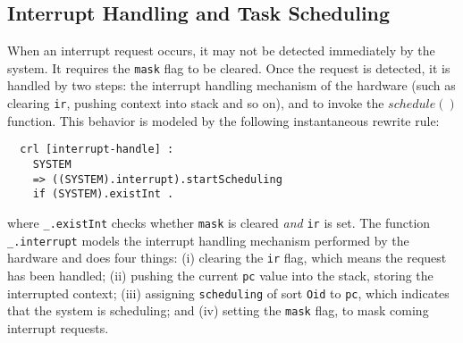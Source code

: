 \documentclass[10pt,journal,compsoc]{IEEEtran}
\begin{document}
\subsection{Interrupt Handling and Task Scheduling}
\label{ss:inthandling}
When an interrupt request occurs, it may not be detected immediately
by the system. It requires the \verb|mask| flag to be cleared. Once
the request is detected, it is handled by two steps: the interrupt
handling mechanism of the hardware (such as clearing \verb|ir|,
pushing context into stack and so on), and to invoke the $schedule()$
function. This behavior is modeled by the following instantaneous
rewrite rule:
\begin{verbatim}
  crl [interrupt-handle] :
    SYSTEM 
    => ((SYSTEM).interrupt).startScheduling
    if (SYSTEM).existInt .
\end{verbatim}
where \verb|_.existInt| checks whether \verb|mask| is cleared
\emph{and} \verb|ir| is set. The function \verb|_.interrupt| models
the interrupt handling mechanism performed by the hardware and does
four things: (i) clearing the \verb|ir| flag, which means the request
has been handled; (ii) pushing the current \verb|pc| value into the
stack, storing the interrupted context; (iii) assigning
\verb|scheduling| of sort \verb|Oid| to \verb|pc|, which indicates
that the system is scheduling; and (iv) setting the \verb|mask| flag,
to mask coming interrupt requests. 
\end{document}
